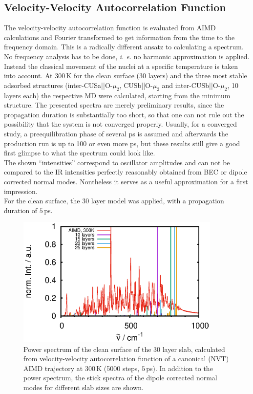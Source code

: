 \documentclass[11pt,DIV=13,BCOR=5mm,a4paper,headinclude]{scrbook}
\begin{document}
\subsection{Velocity-Velocity Autocorrelation Function}\label{vvacf}
The velocity-velocity autocorrelation function is evaluated from AIMD calculations and Fourier transformed to get information from the time to the frequency domain.
This is a radically different ansatz to calculating a spectrum.
No frequency analysis has to be done, \textit{i. e.} no harmonic approximation is applied.
Instead the classical movement of the nuclei at a specific temperature is taken into account.
At $300\,$K for the clean surface (30 layers) and the three most stable adsorbed structures (inter-CUSa||O-$\mu_2$, CUSb||O-$\mu_2$ and inter-CUSb||O-$\mu_2$, 10 layers each) the respective MD were calculated, starting from the minimum structure.
The presented spectra are merely preliminary results, since the propagation duration is substantially too short, so that one can not rule out the possibility that the system is not converged properly.
Usually, for a converged study, a preequilibration phase of several ps is assumed and afterwards the production run is up to 100 or even more ps, but these results still give a good first glimpse to what the spectrum could look like.
\\
The shown ``intensities'' correspond to oscillator amplitudes and can not be compared to the IR intensities perfectly reasonably obtained from BEC or dipole corrected normal modes.
Nontheless it serves as a useful approximation for a first impression.
\\
For the clean surface, the 30 layer model was applied, with a propagation duration of $5\,$ps.
\begin{figure}[!h]
    \centering
    \includegraphics[width=0.9\textwidth]{figures/11-20/comp_cleansurf_all.eps}%
             \caption{Power spectrum of the clean surface of the 30 layer slab, calculated from velocity-velocity autocorrelation function of a canonical (NVT) AIMD trajectory at $300\,$K (5000 steps, $5\,$ps).
In addition to the power spectrum, the stick spectra of the dipole corrected normal modes for different slab sizes are shown.} \label{abb:velvelclean}
\end{figure}
\end{document}
